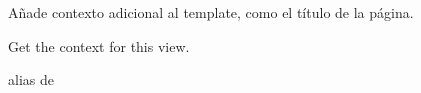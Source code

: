 \documentclass[letterpaper,10pt,spanish]{sphinxmanual}
\begin{document}
\begin{fulllineitems}
\begin{fulllineitems}
\begin{quote}
\begin{description}
\end{description}\end{quote}

\end{fulllineitems}



\begin{fulllineitems}

\pysigstartsignatures
{}
\pysigstopsignatures
\sphinxAtStartPar
Añade contexto adicional al template, como el título de la página.

\end{fulllineitems}



\begin{fulllineitems}

\pysigstartsignatures
{}
\pysigstopsignatures
\end{fulllineitems}



\begin{fulllineitems}

\pysigstartsignatures
{}
\pysigstopsignatures
\sphinxAtStartPar
Get the context for this view.

\end{fulllineitems}



\begin{fulllineitems}

\pysigstartsignatures
{}
\pysigstopsignatures
\sphinxAtStartPar
alias de 

\end{fulllineitems}



\begin{fulllineitems}

\pysigstartsignatures
{}
\pysigstopsignatures
\end{fulllineitems}


\end{fulllineitems}
\end{document}
